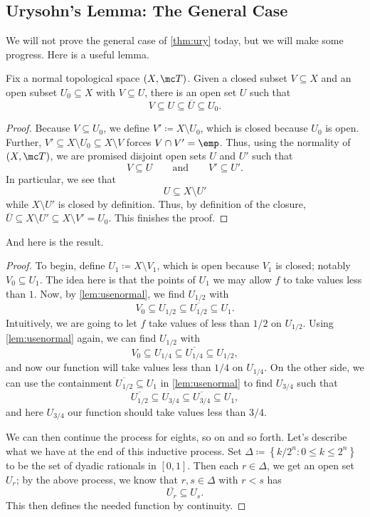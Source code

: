 \documentclass[../notes.tex]{subfiles}
\begin{document}
\subsection{Urysohn's Lemma: The General Case}
We will not prove the general case of \autoref{thm:ury} today, but we will make some progress. Here is a useful lemma.
\begin{lemma} \label{lem:usenormal}
	Fix a normal topological space $(X,\mc T)$. Given a closed subset $V\subseteq X$ and an open subset $U_0\subseteq X$ with $V\subseteq U$, there is an open set $U$ such that
	\[V\subseteq U\subseteq\overline U\subseteq U_0.\]
\end{lemma}
\begin{proof}
	Because $V\subseteq U_0$, we define $V'\coloneqq X\setminus U_0$, which is closed because $U_0$ is open. Further, $V'\subseteq X\setminus U_0\subseteq X\setminus V$ forces $V\cap V'=\emp$. Thus, using the normality of $(X,\mc T)$, we are promised disjoint open sets $U$ and $U'$ such that
	\[V\subseteq U\qquad\text{and}\qquad V'\subseteq U'.\]
	In particular, we see that
	\[U\subseteq X\setminus U'\]
	while $X\setminus U'$ is closed by definition. Thus, by definition of the closure, $\overline U\subseteq X\setminus U'\subseteq X\setminus V'=U_0$. This finishes the proof.
\end{proof}
And here is the result.
\urythm*
\begin{proof}
	To begin, define $U_1\coloneqq X\setminus V_1$, which is open because $V_1$ is closed; notably $V_0\subseteq U_1$. The idea here is that the points of $U_1$ we may allow $f$ to take values less than $1$. Now, by \autoref{lem:usenormal}, we find $U_{1/2}$ with
	\[V_0\subseteq U_{1/2}\subseteq\overline{U_{1/2}}\subseteq U_1.\]
	Intuitively, we are going to let $f$ take values of less than $1/2$ on $U_{1/2}$. Using \autoref{lem:usenormal} again, we can find $U_{1/2}$ with
	\[V_0\subseteq U_{1/4}\subseteq\overline{U_{1/4}}\subseteq U_{1/2},\]
	and now our function will take values less than $1/4$ on $U_{1/4}$. On the other side, we can use the containment $\overline{U_{1/2}}\subseteq U_1$ in \autoref{lem:usenormal} to find $U_{3/4}$ such that
	\[\overline{U_{1/2}}\subseteq U_{3/4}\subseteq\overline{U_{3/4}}\subseteq U_1,\]
	and here $U_{3/4}$ our function should take values less than $3/4.$

	We can then continue the process for eights, so on and so forth. Let's describe what we have at the end of this inductive process. Set $\Delta\coloneqq\left\{k/2^n:0\le k\le 2^n\right\}$ to be the set of dyadic rationals in $[0,1]$. Then each $r\in\Delta$, we get an open set $U_r$; by the above process, we know that $r,s\in\Delta$ with $r<s$ has
	\[\overline{U_r}\subseteq U_s.\]
	This then defines the needed function by continuity.
\end{proof}
\end{document}
